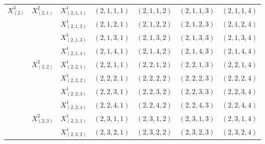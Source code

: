 \documentclass[12pt]{article}
\begin{document}
\begin{table}[p]
\begin{subtable}[t]{0.48\textwidth}
{\begin{tabular}{|c|c|c|c|c|c|c|}
  \hline
  \multirow{16}{*}{$X_{(2)}^{3}$} & \multirow{4}{*}{$X_{(2,1)}^{2}$} & $X_{(2,1,1)}^{1}$ &\cellcolor{red!40} $(2,1,1,1)$ & \cellcolor{blue!40}$(2,1,1,2)$ & \cellcolor{green!40}$(2,1,1,3)$ & \cellcolor{yellow!40}$(2,1,1,4)$ \\ \cline{3-7}
                                  &                                  & $X_{(2,1,2)}^{1}$ &\cellcolor{blue!40} $(2,1,2,1)$ &\cellcolor{green!40} $(2,1,2,2)$ &\cellcolor{yellow!40} $(2,1,2,3)$ &\cellcolor{red!40} $(2,1,2,4)$ \\ \cline{3-7}
                                  &                                  & $X_{(2,1,3)}^{1}$ & \cellcolor{green!40}$(2,1,3,1)$ & \cellcolor{yellow!40} $(2,1,3,2)$ & \cellcolor{red!40} $(2,1,3,3)$ & \cellcolor{blue!40} $(2,1,3,4)$ \\ \cline{3-7}
                                  &                                  & $X_{(2,1,4)}^{1}$ & \cellcolor{yellow!40}$(2,1,4,1)$ & \cellcolor{red!40} $(2,1,4,2)$ & \cellcolor{blue!40} $(2,1,4,3)$ & \cellcolor{green!40} $(2,1,4,4)$ \\ \cline{2-7}
                                  & \multirow{4}{*}{$X_{(2,2)}^{2}$} & $X_{(2,2,1)}^{1}$ & \cellcolor{blue!40}$(2,2,1,1)$ & \cellcolor{green!40}$(2,2,1,2)$ &\cellcolor{yellow!40} $(2,2,1,3)$ & \cellcolor{red!40}$(2,2,1,4)$ \\ \cline{3-7}
                                  &                                  & $X_{(2,2,2)}^{1}$ & \cellcolor{green!40}$(2,2,2,1)$ & \cellcolor{yellow!40} $(2,2,2,2)$ & \cellcolor{red!40} $(2,2,2,3)$ & \cellcolor{blue!40} $(2,2,2,4)$ \\ \cline{3-7}
                                  &                                  & $X_{(2,2,3)}^{1}$ & \cellcolor{yellow!40}$(2,2,3,1)$ & \cellcolor{red!40} $(2,2,3,2)$ & \cellcolor{blue!40} $(2,2,3,3)$ & \cellcolor{green!40} $(2,2,3,4)$ \\ \cline{3-7}
                                  &                                  & $X_{(2,2,4)}^{1}$ & \cellcolor{red!40}$(2,2,4,1)$ & \cellcolor{blue!40} $(2,2,4,2)$ & \cellcolor{green!40} $(2,2,4,3)$ & \cellcolor{yellow!40} $(2,2,4,4)$ \\ \cline{2-7}
                                  & \multirow{4}{*}{$X_{(2,3)}^{2}$} & $X_{(2,3,1)}^{1}$ & \cellcolor{green!40}$(2,3,1,1)$ & \cellcolor{yellow!40} $(2,3,1,2)$ & \cellcolor{red!40} $(2,3,1,3)$ & \cellcolor{blue!40}$(2,3,1,4)$ \\ \cline{3-7}
                                  &                                  & $X_{(2,3,2)}^{1}$ & \cellcolor{yellow!40} $(2,3,2,1)$ & \cellcolor{red!40}$(2,3,2,2)$ &\cellcolor{blue!40} $(2,3,2,3)$ & \cellcolor{green!40}$(2,3,2,4)$ \\ \cline{3-7}

\end{tabular}}
\end{subtable}
\end{table}
\end{document}
